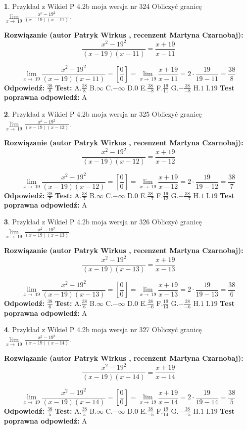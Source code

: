 \documentclass[12pt, a4paper]{article}
\theoremstyle{definition} %
\newtheorem{zad}{}
\newcommand{\zadStart}[1]{\begin{zad}#1\newline}
\newcommand{\zadStop}{\end{zad}}
\newcommand{\rozwStart}[2]{\noindent \textbf{Rozwiązanie (autor #1 , recenzent #2): }\newline}
\newcommand{\rozwStop}{\newline}
\newcommand{\odpStart}{\noindent \textbf{Odpowiedź:}\newline}
\newcommand{\odpStop}{\newline}
\newcommand{\testStart}{\noindent \textbf{Test:}\newline}
\newcommand{\testStop}{\newline}
\newcommand{\kluczStart}{\noindent \textbf{Test poprawna odpowiedź:}\newline}
\newcommand{\kluczStop}{\newline}
\begin{document}
\zadStart{Przykład z Wikieł P 4.2b moja wersja nr 324}
Obliczyć granicę $\lim\limits_{x\to\ 19}\frac{x^{2}-19^{2}}{(x-19)(x-11)}$.
\zadStop
\rozwStart{Patryk Wirkus}{Martyna Czarnobaj}
$$\frac{x^{2}-19^{2}}{(x-19)(x-11)}=\frac{x+19}{x-11}$$

$$\lim\limits_{x\to\ 19}\frac{x^{2}-19^{2}}{(x-19)(x-11)}=[\frac{0}{0}]=\lim\limits_{x\to\ 19}\frac{x+19}{x-11}=2 \cdot \frac{19}{19-11} = \frac{38}{8}$$
\rozwStop
\odpStart
$\frac{38}{8}$
\odpStop
\testStart
A.$\frac{38}{8}$
B.$\infty$
C.$-\infty$
D.$0$
E.$\frac{38}{-8}$
F.$\frac{19}{11}$
G.$-\frac{38}{-8}$
H.$1$
I.$19$
\testStop
\kluczStart
A
\kluczStop



\zadStart{Przykład z Wikieł P 4.2b moja wersja nr 325}
Obliczyć granicę $\lim\limits_{x\to\ 19}\frac{x^{2}-19^{2}}{(x-19)(x-12)}$.
\zadStop
\rozwStart{Patryk Wirkus}{Martyna Czarnobaj}
$$\frac{x^{2}-19^{2}}{(x-19)(x-12)}=\frac{x+19}{x-12}$$

$$\lim\limits_{x\to\ 19}\frac{x^{2}-19^{2}}{(x-19)(x-12)}=[\frac{0}{0}]=\lim\limits_{x\to\ 19}\frac{x+19}{x-12}=2 \cdot \frac{19}{19-12} = \frac{38}{7}$$
\rozwStop
\odpStart
$\frac{38}{7}$
\odpStop
\testStart
A.$\frac{38}{7}$
B.$\infty$
C.$-\infty$
D.$0$
E.$\frac{38}{-7}$
F.$\frac{19}{12}$
G.$-\frac{38}{-7}$
H.$1$
I.$19$
\testStop
\kluczStart
A
\kluczStop



\zadStart{Przykład z Wikieł P 4.2b moja wersja nr 326}
Obliczyć granicę $\lim\limits_{x\to\ 19}\frac{x^{2}-19^{2}}{(x-19)(x-13)}$.
\zadStop
\rozwStart{Patryk Wirkus}{Martyna Czarnobaj}
$$\frac{x^{2}-19^{2}}{(x-19)(x-13)}=\frac{x+19}{x-13}$$

$$\lim\limits_{x\to\ 19}\frac{x^{2}-19^{2}}{(x-19)(x-13)}=[\frac{0}{0}]=\lim\limits_{x\to\ 19}\frac{x+19}{x-13}=2 \cdot \frac{19}{19-13} = \frac{38}{6}$$
\rozwStop
\odpStart
$\frac{38}{6}$
\odpStop
\testStart
A.$\frac{38}{6}$
B.$\infty$
C.$-\infty$
D.$0$
E.$\frac{38}{-6}$
F.$\frac{19}{13}$
G.$-\frac{38}{-6}$
H.$1$
I.$19$
\testStop
\kluczStart
A
\kluczStop



\zadStart{Przykład z Wikieł P 4.2b moja wersja nr 327}
Obliczyć granicę $\lim\limits_{x\to\ 19}\frac{x^{2}-19^{2}}{(x-19)(x-14)}$.
\zadStop
\rozwStart{Patryk Wirkus}{Martyna Czarnobaj}
$$\frac{x^{2}-19^{2}}{(x-19)(x-14)}=\frac{x+19}{x-14}$$

$$\lim\limits_{x\to\ 19}\frac{x^{2}-19^{2}}{(x-19)(x-14)}=[\frac{0}{0}]=\lim\limits_{x\to\ 19}\frac{x+19}{x-14}=2 \cdot \frac{19}{19-14} = \frac{38}{5}$$
\rozwStop
\odpStart
$\frac{38}{5}$
\odpStop
\testStart
A.$\frac{38}{5}$
B.$\infty$
C.$-\infty$
D.$0$
E.$\frac{38}{-5}$
F.$\frac{19}{14}$
G.$-\frac{38}{-5}$
H.$1$
I.$19$
\testStop
\kluczStart
A
\kluczStop
\end{document}
